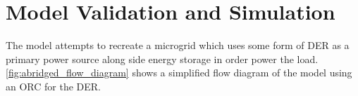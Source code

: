 \chapter{Model Validation and Simulation}
\label{ch:model}

The model attempts to recreate a microgrid which uses some form of DER as a primary power source along side energy storage in order power the load. \autoref{fig:abridged_flow_diagram} shows a simplified flow diagram of the model using an ORC for the DER.

